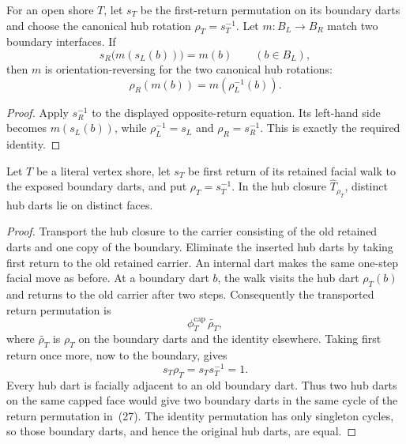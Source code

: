 \begin{lemma}
\label{lem:canonical-hub-orientation}
For an open shore \(T\), let \(s_T\) be the first-return permutation on its
boundary darts and choose the canonical hub rotation
\(\rho_T=s_T^{-1}\).  Let \(m:B_L\to B_R\) match two boundary interfaces.
If
\[
        s_R\bigl(m(s_L(b))\bigr)=m(b)
        \qquad(b\in B_L),
\]
then \(m\) is orientation-reversing for the two canonical hub rotations:
\[
        \rho_R(m(b))=m(\rho_L^{-1}(b)).
\]
\end{lemma}

\begin{proof}
Apply \(s_R^{-1}\) to the displayed opposite-return equation.  Its
left-hand side becomes \(m(s_L(b))\), while
\(\rho_L^{-1}=s_L\) and \(\rho_R=s_R^{-1}\).  This is exactly the required
identity.
\end{proof}

\begin{lemma}
\label{lem:canonical-hub-face-simple}
Let \(T\) be a literal vertex shore, let \(s_T\) be first return of its
retained facial walk to the exposed boundary darts, and put
\(\rho_T=s_T^{-1}\).  In the hub closure
\(\widehat T_{\rho_T}\), distinct hub darts lie on distinct faces.
\end{lemma}

\begin{proof}
Transport the hub closure to the carrier consisting of the old retained
darts and one copy of the boundary.  Eliminate the inserted hub darts by
taking first return to the old retained carrier.  An internal dart makes the
same one-step facial move as before.  At a boundary dart \(b\), the walk
visits the hub dart \(\rho_T(b)\) and returns to the old carrier after two
steps.  Consequently the transported return permutation is
\[
  \phi_T^{\mathrm{cap}}\,\widetilde{\rho_T},
\]
where \(\widetilde{\rho_T}\) is \(\rho_T\) on the boundary darts and the
identity elsewhere.  Taking first return once more, now to the boundary,
gives
\[
       s_T\rho_T=s_Ts_T^{-1}=1.                 \tag{27}
\]
Every hub dart is facially adjacent to an old boundary dart.  Thus two hub
darts on the same capped face would give two boundary darts in the same
cycle of the return permutation in~(27).  The identity permutation has only
singleton cycles, so those boundary darts, and hence the original hub darts,
are equal.
\end{proof}

